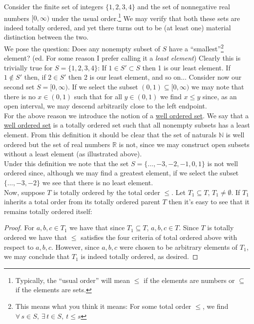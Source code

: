 \documentclass[12pt]{article}
\newlength\tindent
\renewcommand{\indent}{\hspace*{\tindent}}
\newcommand{\R}{\mathbb R}
\newcommand{\N}{\mathbb N}
\begin{document}
\indent Consider the finite set of integers $\{1,2,3,4\}$ and the set of nonnegative real numbers $[0, \infty)$ under the usual order.\footnote{Typically, the ``usual order'' will mean $\leq$ if the elements are numbers or $\subseteq$ if the elements are sets.} We may verify that both these sets are indeed totally ordered, and yet there turns out to be (at least one) material distinction between the two. \\

\indent We pose the question: Does any nonempty subset of $S$ have a ``smallest''\footnote{This means what you think it means: For some total order $\leq$, we find $\forall\,s \in S,~\exists\,t\in S,~ t\leq s$} element? (ed. For some reason I prefer calling it a {\em least element}) Clearly this is trivially true for $S = \{1,2,3,4\}$: If $1 \in S' \subset S$ then 1 is our least element. If $1 \notin S'$ then, if $2 \in S'$ then 2 is our least element, and so on... Consider now our second set $S = [0, \infty)$. If we select the subset $(0, 1) \subseteq [0, \infty)$ we may note that there is no $x \in (0, 1)$ such that for all $y \in (0, 1)$ we find $x \leq y$ since, as an open interval, we may descend arbitrarily close to the left endpoint. \\

\indent For the above reason we introduce the notion of a \underline{well ordered set}. We say that a \underline{well ordered set} is a totally ordered set such that all nonempty subsets has a least element. From this definition it should be clear that the set of naturals $\N$ is well ordered but the set of real numbers $\R$ is not, since we may construct open subsets without a least element (as illustrated above). \\

\indent Under this definition we note that the set $S = \{..., -3, -2, -1, 0, 1\}$ is not well ordered since, although we may find a greatest element, if we select the subset $\{..., -3, -2\}$ we see that there is no least element. \\

\indent Now, suppose $T$ is totally ordered by the total order $\leq$. Let $T_1 \subseteq T$, $T_1 \neq \emptyset$. If $T_1$ inherits a total order from its totally ordered parent $T$ then it's easy to see that it remains totally ordered itself:
\begin{proof} For $a,b,c \in T_1$ we have that since $T_1 \subseteq T$, $a,b,c \in T$. Since $T$ is totally ordered we have that $\leq$ satisfies the four criteria of total ordered above with respect to $a,b,c$. However, since $a,b,c$ were chosen to be arbitrary elements of $T_1$, we may conclude that $T_1$ is indeed totally ordered, as desired.
\end{proof}
\end{document}
